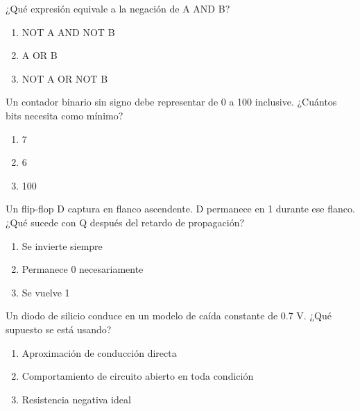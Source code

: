 \noindent\begin{minipage}{\linewidth}\setlength{\parskip}{4pt}\label{q:H-013}
¿Qué expresión equivale a la negación de A AND B?
\begin{enumerate}[label=\Alph*),nosep]
\item NOT A AND NOT B
\item A OR B
\item NOT A OR NOT B
\end{enumerate}\end{minipage}\par\medskip

\noindent\begin{minipage}{\linewidth}\setlength{\parskip}{4pt}\label{q:H-014}
Un contador binario sin signo debe representar de 0 a 100 inclusive. ¿Cuántos bits necesita como mínimo?
\begin{enumerate}[label=\Alph*),nosep]
\item 7
\item 6
\item 100
\end{enumerate}\end{minipage}\par\medskip

\noindent\begin{minipage}{\linewidth}\setlength{\parskip}{4pt}\label{q:H-015}
Un flip-flop D captura en flanco ascendente. D permanece en 1 durante ese flanco. ¿Qué sucede con Q después del retardo de propagación?
\begin{enumerate}[label=\Alph*),nosep]
\item Se invierte siempre
\item Permanece 0 necesariamente
\item Se vuelve 1
\end{enumerate}\end{minipage}\par\medskip

\noindent\begin{minipage}{\linewidth}\setlength{\parskip}{4pt}\label{q:H-016}
Un diodo de silicio conduce en un modelo de caída constante de 0.7 V. ¿Qué supuesto se está usando?
\begin{enumerate}[label=\Alph*),nosep]
\item Aproximación de conducción directa
\item Comportamiento de circuito abierto en toda condición
\item Resistencia negativa ideal
\end{enumerate}\end{minipage}\par\medskip

